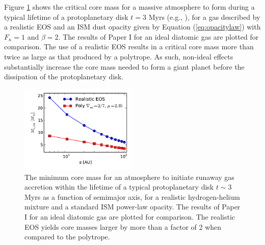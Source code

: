 \documentclass[apj]{emulateapj}
\begin{document}


Figure \ref{fig:Mvsaplot} shows the critical core mass for a massive atmosphere to form during a typical lifetime of a protoplanetary disk $t=3$ Myrs (e.g., \citealt{jay99}), for a gas described by a realistic EOS and an ISM dust opacity given by Equation (\ref{eq:opacitylaw}) with $F_{\kappa}=1$ and $\beta=2$. The results of Paper I for an ideal diatomic gas are plotted for comparison. The use of a realistic EOS results in a critical core mass more than twice as large as that produced by a polytrope. As such, non-ideal effects substantially increase the core mass needed to form a giant planet  before the dissipation of the protoplanetary disk.   

\begin{figure}[h!]
\centering
\includegraphics[width=0.5\textwidth]{../../figs/ModelAtmospheres/RadSelfGravRealEOS/PaperFigs/Mc_vs_a_poly_real_paper.pdf}
\caption{The minimum core mass for an atmosphere to initiate runaway gas accretion within the lifetime of a typical protoplanetary disk $t \sim 3$ Myrs as a function of semimajor axis, for a realistic hydrogen-helium mixture and a standard ISM power-law opacity. The results of Paper I for an ideal diatomic gas are plotted for comparison. The realistic EOS yields core masses larger by more than a factor of 2 when compared to the polytrope.}
\label{fig:Mvsaplot}
\end{figure}
\end{document}
